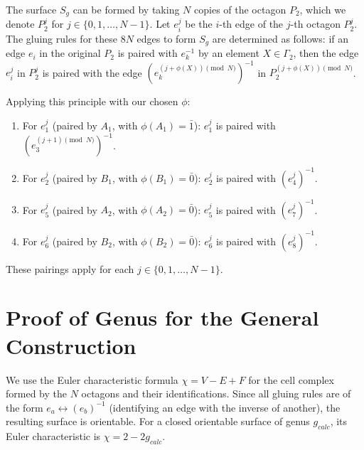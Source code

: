 \documentclass{article}
\theoremstyle{definition}
\theoremstyle{remark}
\begin{document}
The surface $S_g$ can be formed by taking $N$ copies of the octagon $P_2$, which we denote $P_2^j$ for $j \in \{0, 1, \ldots, N-1\}$. Let $e_i^j$ be the $i$-th edge of the $j$-th octagon $P_2^j$. The gluing rules for these $8N$ edges to form $S_g$ are determined as follows: if an edge $e_i$ in the original $P_2$ is paired with $e_k^{-1}$ by an element $X \in \Gamma_2$, then the edge $e_i^j$ in $P_2^j$ is paired with the edge $(e_k^{(j+\phi(X)) \pmod N})^{-1}$ in $P_2^{(j+\phi(X)) \pmod N}$.

Applying this principle with our chosen $\phi$:
\begin{enumerate}
    \item For $e_1^j$ (paired by $A_1$, with $\phi(A_1)=\bar{1}$): $e_1^j$ is paired with $(e_3^{(j+1) \pmod N})^{-1}$.
    \item For $e_2^j$ (paired by $B_1$, with $\phi(B_1)=\bar{0}$): $e_2^j$ is paired with $(e_4^j)^{-1}$.
    \item For $e_5^j$ (paired by $A_2$, with $\phi(A_2)=\bar{0}$): $e_5^j$ is paired with $(e_7^j)^{-1}$.
    \item For $e_6^j$ (paired by $B_2$, with $\phi(B_2)=\bar{0}$): $e_6^j$ is paired with $(e_8^j)^{-1}$.
\end{enumerate}
These pairings apply for each $j \in \{0, 1, \ldots, N-1\}$.

\section{Proof of Genus for the General Construction}
We use the Euler characteristic formula $\chi = V - E + F$ for the cell complex formed by the $N$ octagons and their identifications. Since all gluing rules are of the form $e_a \leftrightarrow (e_b)^{-1}$ (identifying an edge with the inverse of another), the resulting surface is orientable. For a closed orientable surface of genus $g_{calc}$, its Euler characteristic is $\chi = 2 - 2g_{calc}$.
\end{document}

